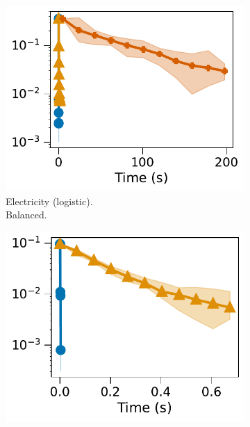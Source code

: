 \begin{figure}[t]
\begin{subfigure}{0.045\linewidth}
    \begin{minipage}{.1cm}
      \vfill
    \end{minipage}
  \end{subfigure}%
  \begin{subfigure}{0.3\linewidth}
    \centering
    \includegraphics[width=\linewidth]{plots/time_optimization_electricity_norm.pdf}
    \caption{Electricity (logistic).\\ Balanced.}
    \label{fig:expe-time-electricity-norm}
  \end{subfigure}%
  \begin{subfigure}{0.3\linewidth}
    \centering
    \includegraphics[width=\linewidth]{plots/time_optimization_california_norm.pdf}

\end{subfigure}
\end{figure}

